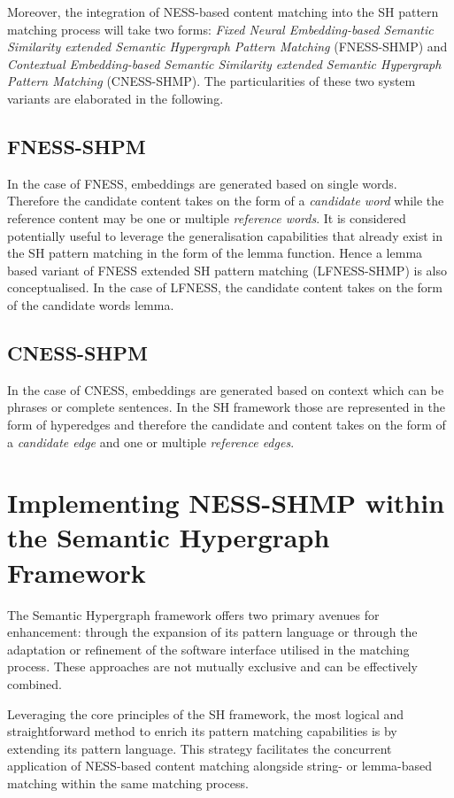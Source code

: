 \documentclass[11pt]{scrreprt}
\begin{document}
Moreover, the integration of NESS-based content matching into the SH pattern matching process will take two forms: \textit{Fixed Neural Embedding-based Semantic Similarity extended Semantic Hypergraph Pattern Matching} (FNESS-SHMP) and  \textit{Contextual Embedding-based Semantic Similarity extended Semantic Hypergraph Pattern Matching} (CNESS-SHMP). The particularities of these two system variants are elaborated in the following.

\subsection{FNESS-SHPM}
In the case of FNESS, embeddings are generated based on single words. Therefore the candidate content takes on the form of a \textit{candidate word} while the reference content may be one or multiple \textit{reference words}. It is considered potentially useful to leverage the generalisation capabilities that already exist in the SH pattern matching in the form of the lemma function. Hence a lemma based variant of FNESS extended SH pattern matching (LFNESS-SHMP) is also conceptualised. In the case of LFNESS, the candidate content takes on the form of the candidate words lemma.

\subsection{CNESS-SHPM}
In the case of CNESS, embeddings are generated based on context which can be phrases or complete sentences. In the SH framework those are represented in the form of hyperedges and therefore the candidate and content takes on the form of a \textit{candidate edge} and one or multiple \textit{reference edges}. 

\section{Implementing NESS-SHMP within the Semantic Hypergraph Framework}

The Semantic Hypergraph framework offers two primary avenues for enhancement: through the expansion of its pattern language or through the adaptation or refinement of the software interface utilised in the matching process. These approaches are not mutually exclusive and can be effectively combined.

Leveraging the core principles of the SH framework, the most logical and straightforward method to enrich its pattern matching capabilities is by extending its pattern language. This strategy facilitates the concurrent application of NESS-based content matching alongside string- or lemma-based matching within the same matching process.
\end{document}

